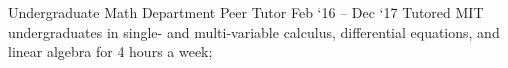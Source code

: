 \experience
    {Undergraduate Math Department}
    {Peer Tutor}
    {Feb `16 -- Dec `17}
    {
        Tutored MIT undergraduates in single- and multi-variable calculus, differential equations,
        and linear algebra for 4 hours a week;
    }
